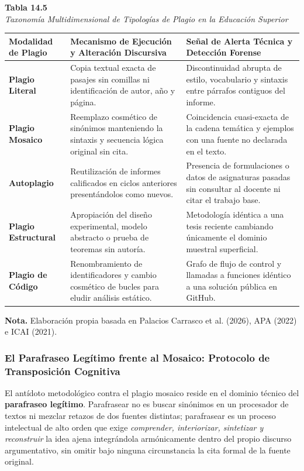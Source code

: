 \begin{table}[htbp]
\centering
\small
\renewcommand{\arraystretch}{1.25}
\textbf{Tabla 14.5}\\[0.15cm]
\textit{Taxonomía Multidimensional de Tipologías de Plagio en la Educación Superior}\\[0.25cm]
\begin{tabularx}{\textwidth}{p{2.8cm}X p{5.5cm}}
\toprule
\textbf{Modalidad de Plagio} & \textbf{Mecanismo de Ejecución y Alteración Discursiva} & \textbf{Señal de Alerta Técnica y Detección Forense} \\
\midrule
\textbf{Plagio Literal} & Copia textual exacta de pasajes sin comillas ni identificación de autor, año y página. & Discontinuidad abrupta de estilo, vocabulario y sintaxis entre párrafos contiguos del informe. \\
\textbf{Plagio Mosaico} & Reemplazo cosmético de sinónimos manteniendo la sintaxis y secuencia lógica original sin cita. & Coincidencia cuasi-exacta de la cadena temática y ejemplos con una fuente no declarada en el texto. \\
\textbf{Autoplagio} & Reutilización de informes calificados en ciclos anteriores presentándolos como nuevos. & Presencia de formulaciones o datos de asignaturas pasadas sin consultar al docente ni citar el trabajo base. \\
\textbf{Plagio Estructural} & Apropiación del diseño experimental, modelo abstracto o prueba de teoremas sin autoría. & Metodología idéntica a una tesis reciente cambiando únicamente el dominio muestral superficial. \\
\textbf{Plagio de Código} & Renombramiento de identificadores y cambio cosmético de bucles para eludir análisis estático. & Grafo de flujo de control y llamadas a funciones idéntico a una solución pública en GitHub. \\
\bottomrule
\end{tabularx}
\vspace{0.15cm}
\raggedright \scriptsize \textbf{Nota.} Elaboración propia basada en Palacios Carrasco et al. (2026), APA (2022) e ICAI (2021).
\end{table}

\subsubsection{El Parafraseo Legítimo frente al Mosaico: Protocolo de Transposición Cognitiva}

El antídoto metodológico contra el plagio mosaico reside en el dominio técnico del \textbf{parafraseo legítimo}. Parafrasear no es buscar sinónimos en un procesador de textos ni mezclar retazos de dos fuentes distintas; parafrasear es un proceso intelectual de alto orden que exige \textit{comprender, interiorizar, sintetizar y reconstruir} la idea ajena integrándola armónicamente dentro del propio discurso argumentativo, sin omitir bajo ninguna circunstancia la cita formal de la fuente original.


